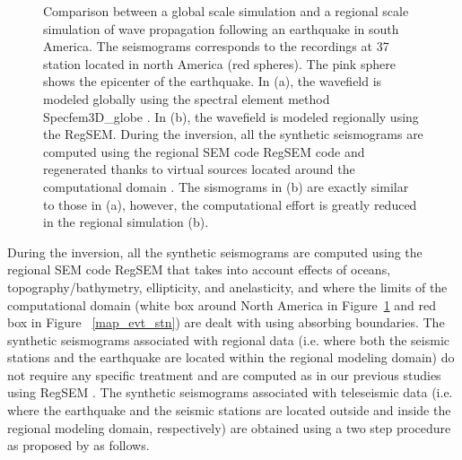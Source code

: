\documentclass[12pt]{article}
\begin{document}
\begin{figure}[p]
	\caption{\baselineskip 18pt 
		Comparison between a global scale simulation and a regional scale simulation of wave propagation following an earthquake in south America. The seismograms corresponds to the recordings at 37 station located in north America (red spheres).
		The pink sphere shows the epicenter of the earthquake. In (a), the wavefield is modeled globally using the spectral element method Specfem3D\_globe \citep{komatitsch2002spectrala}. In (b), the wavefield is modeled regionally using the RegSEM. During the inversion, all the synthetic seismograms are computed using the regional SEM code RegSEM \citep{cupillard2012regsem} code and regenerated thanks to virtual sources located around the computational domain \citep[see][]{masson2013numerical}. The sismograms in (b) are exactly similar to those in (a), however, the computational effort is greatly reduced in the regional simulation (b).}

	\label{injection}

\end{figure}

During the inversion, all the synthetic seismograms are computed using the regional SEM code RegSEM \citep{cupillard2012regsem} that takes into account effects of oceans, topography/bathymetry, ellipticity, and anelasticity, and where the limits of the computational domain (white box around North America in Figure~\ref{injection} and red box in Figure ~\ref{map_evt_stn}) are dealt with using absorbing boundaries. 
The synthetic seismograms associated with regional data (i.e. where both the seismic stations and the earthquake are located within the regional modeling domain) do not require any specific treatment and are computed as in our previous studies using RegSEM \citep[e.g.][]{yuan2014lithospheric}. 
The synthetic seismograms associated with teleseismic data (i.e. where the earthquake and the seismic stations are located outside and inside the regional modeling domain, respectively) are obtained using a two step procedure as proposed by \cite{masson2016box} as follows. 
\end{document}
